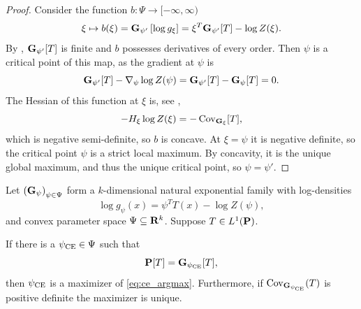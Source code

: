 \begin{proof}
    Consider the function $b: \Psi \to [-\infty, \infty)$
    $$
        \xi \mapsto b(\xi) = \G_{\psi'} \left[ \log g_{\xi} \right] = \xi^{T}\G_{\psi'} [T] - \log Z(\xi).
    $$
    By , $\G_{\psi'}[T]$ is finite and $b$ possesses derivatives of every order.
    Then $\psi$ is a critical point of this map, as the gradient at $\psi$ is
    $$
        \G_{\psi'} [T] - \nabla_{\psi} \log Z(\psi) = \G_{\psi'}[T] - \G_{\psi}[T] = 0.
    $$
    The Hessian of this function at $\xi$ is, see ,
    $$
        -H_{\xi} \log Z(\xi) = - \cov_{\G_{\xi}} [T],
    $$
    which is negative semi-definite, so $b$ is concave. At $\xi = \psi$ it is negative definite, so the critical point $\psi$ is a strict local maximum. By concavity, it is the unique global maximum, and thus the unique critical point, so $\psi = \psi'$.
\end{proof}

\begin{proposition}
    \label{prop:cem_exponential_families}
    Let $\left( \G_{\psi} \right)_{\psi \in \Psi}$ form a $k$-dimensional natural exponential family with log-densities 
    $$
    \log g_{\psi}(x) = \psi^{T} T(x) - \log Z(\psi),
    $$
    and convex parameter space $\Psi \subseteq \R^{k}$. 
    Suppose $T \in L^{1}(\P)$.

    If there is a $\pce \in \Psi$ such that 
    $$
    \P[T] = \G_{\pce} [T],
    $$
    then $\pce$ is a maximizer of \eqref{eq:ce_argmax}. Furthermore, if $\cov_{\G_{\pce}} (T)$ is positive definite the maximizer is unique.
\end{proposition}

